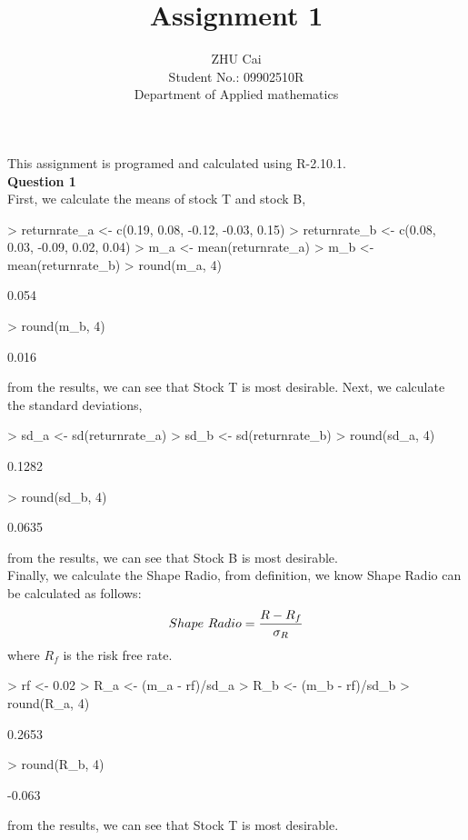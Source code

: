 \documentclass[a4paper,12pt]{article}
\title{Assignment 1}
\author{ZHU Cai\\
Student No.: 09902510R\\
Department of Applied mathematics}
\begin{document}
\maketitle
This assignment is programed and calculated using R-2.10.1.\\

\noindent\textbf{Question 1}\\

\noindent First, we calculate the means of stock T and stock B,
\begin{Schunk}
\begin{Sinput}
> returnrate_a <- c(0.19, 0.08, -0.12, -0.03, 0.15)
> returnrate_b <- c(0.08, 0.03, -0.09, 0.02, 0.04)
> m_a <- mean(returnrate_a)
> m_b <- mean(returnrate_b)
> round(m_a, 4)
\end{Sinput}
\begin{Soutput}
[1] 0.054
\end{Soutput}
\begin{Sinput}
> round(m_b, 4)
\end{Sinput}
\begin{Soutput}
[1] 0.016
\end{Soutput}
\end{Schunk}
from the results, we can see that Stock T is most desirable. Next, we calculate the standard deviations,
\begin{Schunk}
\begin{Sinput}
> sd_a <- sd(returnrate_a)
> sd_b <- sd(returnrate_b)
> round(sd_a, 4)
\end{Sinput}
\begin{Soutput}
[1] 0.1282
\end{Soutput}
\begin{Sinput}
> round(sd_b, 4)
\end{Sinput}
\begin{Soutput}
[1] 0.0635
\end{Soutput}
\end{Schunk}
from the results, we can see that Stock B is most desirable.\\
\noindent Finally, we calculate the Shape Radio, from definition, we know Shape Radio can be calculated as follows:\\
\begin{equation}
\centering
Shape\ Radio = \frac{R-R_f}{\sigma_R}
\end{equation}
where $R_f$ is the risk free rate.
\begin{Schunk}
\begin{Sinput}
> rf <- 0.02
> R_a <- (m_a - rf)/sd_a
> R_b <- (m_b - rf)/sd_b
> round(R_a, 4)
\end{Sinput}
\begin{Soutput}
[1] 0.2653
\end{Soutput}
\begin{Sinput}
> round(R_b, 4)
\end{Sinput}
\begin{Soutput}
[1] -0.063
\end{Soutput}
\end{Schunk}
from the results, we can see that Stock T is most desirable.\\
\end{document}
